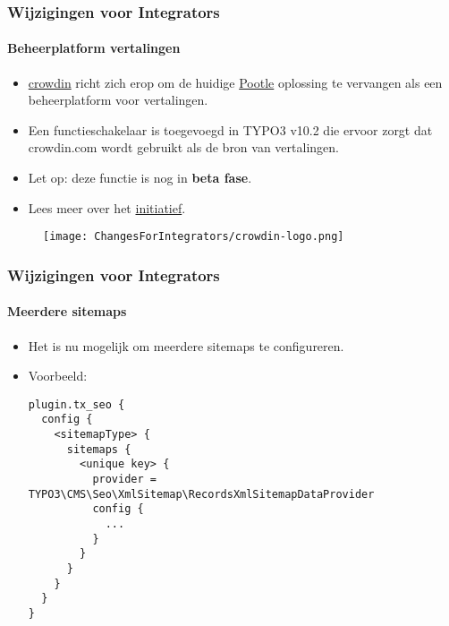 
\begin{frame}[fragile]
	\frametitle{Wijzigingen voor Integrators}
	\framesubtitle{Beheerplatform vertalingen}

	\begin{itemize}

		\item \href{https://crowdin.com/}{crowdin} richt zich erop om de huidige
			\href{https://translation.typo3.org/}{Pootle}
			oplossing te vervangen als een beheerplatform voor vertalingen.

		\item Een functieschakelaar is toegevoegd in TYPO3 v10.2 die ervoor zorgt dat crowdin.com
			wordt gebruikt als de bron van vertalingen.

		\item Let op: deze functie is nog in \textbf{beta fase}.

		\item Lees meer over het
			\href{https://typo3.org/community/teams/typo3-development/initiatives/localization-with-crowdin/}{initiatief}.

	\end{itemize}

	\begin{figure}
		\texttt{[image: ChangesForIntegrators/crowdin-logo.png]}
	\end{figure}

\end{frame}


\begin{frame}[fragile]
	\frametitle{Wijzigingen voor Integrators}
	\framesubtitle{Meerdere sitemaps}

	\lstset{basicstyle=\tiny\ttfamily}

	\begin{itemize}

		\item Het is nu mogelijk om meerdere sitemaps te configureren.
		\item Voorbeeld:
\begin{lstlisting}
plugin.tx_seo {
  config {
    <sitemapType> {
      sitemaps {
        <unique key> {
          provider = TYPO3\CMS\Seo\XmlSitemap\RecordsXmlSitemapDataProvider
          config {
            ...
          }
        }
      }
    }
  }
}
\end{lstlisting}

	\end{itemize}

\end{frame}

